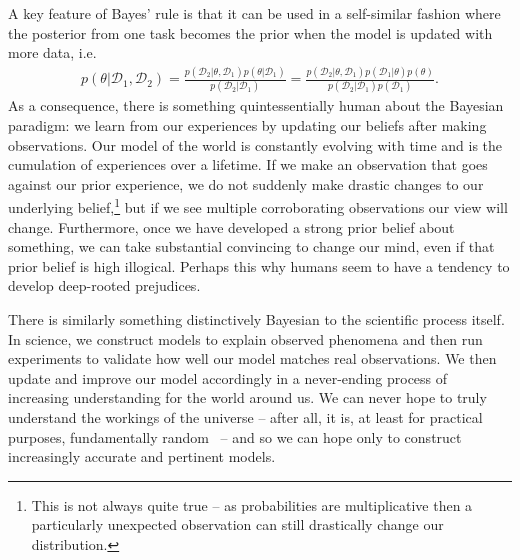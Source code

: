 A key feature of Bayes' rule is that it can be used in a self-similar fashion where the posterior from
one task becomes the prior when the model is updated with more data, i.e.
\begin{align}
	\label{eq:bayes:repeat-bayes}
p(\theta | \mathcal{D}_1, \mathcal{D}_2) = 
\frac{p(\mathcal{D}_2 | \theta, \mathcal{D}_1)p(\theta | \mathcal{D}_1)}{p(\mathcal{D}_2 | \mathcal{D}_1)} =
\frac{p(\mathcal{D}_2 | \theta, \mathcal{D}_1)p(\mathcal{D}_1 | \theta) p(\theta)}
{p(\mathcal{D}_2 | \mathcal{D}_1) p(\mathcal{D}_1)} .
\end{align}
As a consequence, there is something quintessentially human about the Bayesian paradigm: we learn
from our experiences by updating our beliefs after making observations.  Our model of the world
is constantly evolving with time and is the cumulation of experiences over a lifetime.  
If we make an observation that goes against our prior experience, we do not suddenly make
drastic changes to our underlying belief,\footnote{This is not always quite true --
	as probabilities are multiplicative then a particularly unexpected
	observation can still drastically change our distribution.}
 but if we see multiple corroborating observations our
view will change.
Furthermore, once we have developed
a strong prior belief about something, we can take substantial convincing to change our mind, even
if that prior belief is high illogical.  Perhaps this why humans seem to have a tendency to develop
deep-rooted prejudices.

There is similarly something distinctively Bayesian to the scientific process itself.  In science, we construct models
to explain observed phenomena and then run experiments to validate how well our model matches
real observations.  We then update and improve our model accordingly in a never-ending process of
increasing understanding for the world around us.  We can never hope to truly understand the workings
of the universe  -- after all, it is, at least for practical purposes, fundamentally random~\citep{rainforth2013random} 
-- and so we can hope only to construct increasingly accurate and pertinent models.

